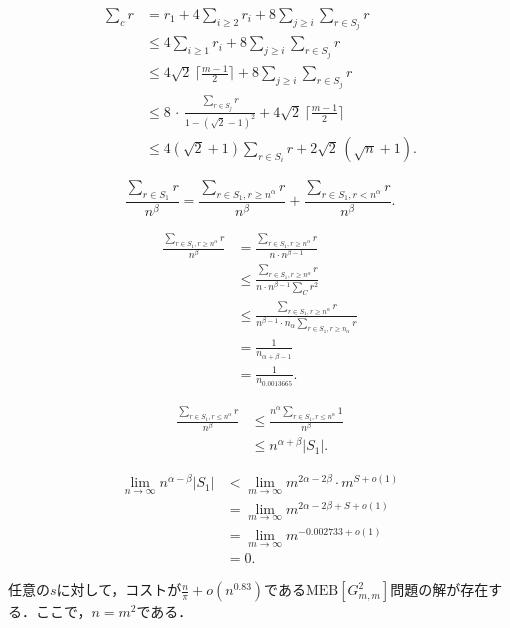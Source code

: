 \documentclass{classes/resume}
\begin{document}
\[
\begin{aligned}
  \sum_{c}r
  &= r_{1} + 4\sum_{i\ge2}r_{i}
       + 8\sum_{j\ge i}\sum_{r\in S_{j}}r \\ 
  &\le 4\sum_{i\ge1}r_{i}
       + 8\sum_{j\ge i}\sum_{r\in S_{j}}r \\ 
  &\le 4\sqrt{2}\,\bigl\lceil\tfrac{m-1}{2}\bigr\rceil
       + 8\sum_{j\ge i}\sum_{r\in S_{j}}r \\ 
  &\le 8 \,\cdot\, \frac{\sum_{r\in S_{j}}r}{1 - (\sqrt{2}-1)^{2}}
       + 4\sqrt{2}\,\bigl\lceil\tfrac{m-1}{2}\bigr\rceil \\ 
  &\le 4(\sqrt{2}+1)\sum_{r\in S_{i}}r
       + 2\sqrt{2}\,(\sqrt{n} + 1).
\end{aligned}
\]

\[
\frac{\sum_{r \in S_1} r}{n^{\beta}} = \frac{\sum_{r \in S_1, r \geq n^{\alpha}} r}{n^{\beta}} + \frac{\sum_{r \in S_1, r < n^{\alpha}} r}{n^{\beta}}.
\]

\[
\begin{aligned}
\frac{\sum_{r \in S_1, r \geq n^{\alpha}} r}{n^{\beta}}
&= \frac{\sum_{r \in S_1, r \geq n^{\alpha}} r}{n \cdot n^{\beta - 1}} \\
&\le \frac{\sum_{r \in S_1, r \geq n^{\alpha}} r}{n \cdot n^{\beta - 1}\sum_{C}r^2} \\
&\le \frac{\sum_{r \in S_1, r \geq n^{\alpha}} r}{n^{\beta - 1} \cdot n_\alpha \sum_{r \in S_1, r \geq n_\alpha} r} \\
&= \frac{1}{n_{\alpha + \beta -1}} \\
&= \frac{1}{n_{0.0013665}}.
\end{aligned}
\]

\[
\begin{aligned}
\frac{\sum_{r \in S_1, r \le n^\alpha}r}{n^\beta} &\le \frac{n^\alpha \sum_{r \in S_1, r \le n^\alpha} 1}{n^\beta} \\
&\leq n^{\alpha + \beta} |S_1|.
\end{aligned}
\]

\[
\begin{aligned}
\lim_{n \to \infty} n^{\alpha - \beta} |S_1| 
&< \lim_{m \to \infty} m^{2\alpha - 2\beta} \cdot m^{S + o(1)} \\
&= \lim_{m \to \infty} m^{2\alpha - 2\beta + S + o(1)} \\
&= \lim_{m \to \infty} m^{-0.002733 + o(1)} \\
&= 0.
\end{aligned}
\]

\begin{theorem}
    任意の$s$に対して，コストが$\frac{n}{\pi} + o(n^{0.83})$である$\mathrm{MEB}[G_{m,m}^{2}]$問題の解が存在する．ここで，$n = m^2$である．
\end{theorem}
\end{document}
